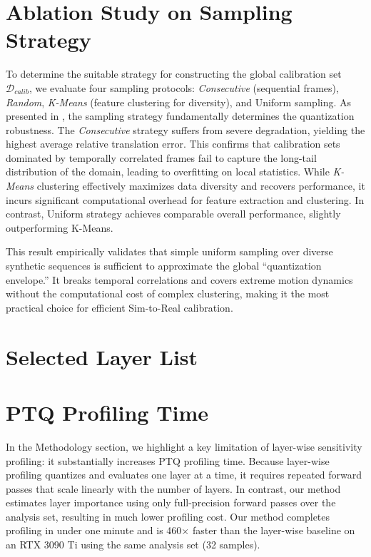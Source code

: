 
\section{Ablation Study on Sampling Strategy}
\label{sec:sampling_ablation}



To determine the suitable strategy for constructing the global calibration set $\mathcal{D}_{calib}$, we evaluate four sampling protocols: \textit{Consecutive} (sequential frames), \textit{Random}, \textit{K-Means} (feature clustering for diversity), and Uniform sampling. As presented in , the sampling strategy fundamentally determines the quantization robustness. The \textit{Consecutive} strategy suffers from severe degradation, yielding the highest average relative translation error. This confirms that calibration sets dominated by temporally correlated frames fail to capture the long-tail distribution of the domain, leading to overfitting on local statistics. While \textit{K-Means} clustering effectively maximizes data diversity and recovers performance, it incurs significant computational overhead for feature extraction and clustering. In contrast, Uniform strategy achieves comparable overall performance, slightly outperforming K-Means.
    
This result empirically validates that simple uniform sampling over diverse synthetic sequences is sufficient to approximate the global ``quantization envelope.'' It breaks temporal correlations and covers extreme motion dynamics without the computational cost of complex clustering, making it the most practical choice for efficient Sim-to-Real calibration.


\section{Selected Layer List}
\label{sec:selected_layers}




\section{PTQ Profiling Time}
\label{sec:ptq_profiling}

In the Methodology section, we highlight a key limitation of layer-wise sensitivity profiling: it substantially increases PTQ profiling time. Because layer-wise profiling quantizes and evaluates one layer at a time, it requires repeated forward passes that scale linearly with the number of layers. In contrast, our method estimates layer importance using only full-precision forward passes over the analysis set, resulting in much lower profiling cost. Our method completes profiling in under one minute and is 460$\times$ faster than the layer-wise baseline on an RTX 3090 Ti using the same analysis set (32 samples).


